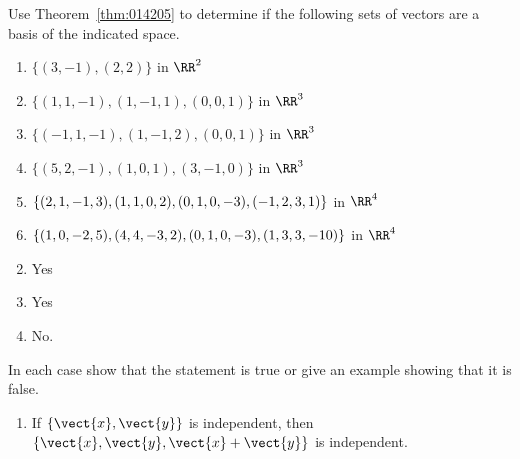 \begin{multicols}{2}
\begin{ex}
\begin{sol}
\begin{enumerate}[label={\alph*.}]
\end{enumerate}
\end{sol}
\end{ex}

\begin{ex}\label{ex:5_2_6}
Use Theorem~\ref{thm:014205} to determine if the following sets of vectors are a basis of the indicated space.

\begin{enumerate}[label={\alph*.}]
\item $\{(3, -1), (2, 2)\}$ in $\RR^2$

\item $\{(1, 1, -1), (1, -1, 1), (0, 0, 1)\}$ in $\RR^3$

\item $\{(-1, 1, -1), (1, -1, 2), (0, 0, 1)\}$ in $\RR^3$

\item $\{(5, 2, -1), (1, 0, 1), (3, -1, 0)\}$ in $\RR^3$

\item $\{(2, 1, -1, 3), (1, 1, 0, 2), (0, 1, 0, -3), \\(-1, 2, 3, 1)\}$ in $\RR^4$

\item $\{(1, 0, -2, 5), (4, 4, -3, 2), (0, 1, 0, -3), \\(1, 3, 3, -10)\}$ in $\RR^4$

\end{enumerate}
\begin{sol}
\begin{enumerate}[label={\alph*.}]
\setcounter{enumi}{1}
\item  Yes

\setcounter{enumi}{3}
\item  Yes

\setcounter{enumi}{5}
\item  No.

\end{enumerate}
\end{sol}
\end{ex}

\begin{ex}
In each case show that the statement is true or give an example showing that it is false.

\begin{enumerate}[label={\alph*.}]
\item If $\{\vect{x}, \vect{y}\}$ is independent, then $\{\vect{x}, \vect{y}, \vect{x} + \vect{y}\}$ is independent.


\end{enumerate}
\end{ex}
\end{multicols}
